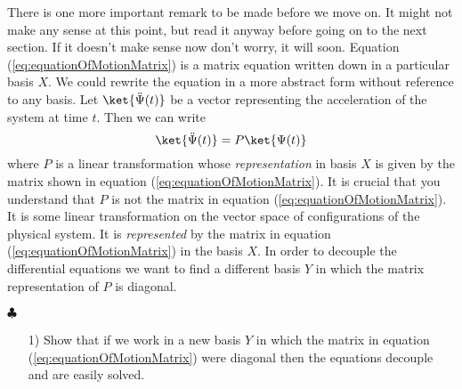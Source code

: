 There is one more important remark to be made before we move on.
It might not make any sense at this point, but read it anyway before going on to the next section.
If it doesn't make sense now don't worry, it will soon.
Equation (\ref{eq:equationOfMotionMatrix}) is a matrix equation written down in a particular basis $X$.
We could rewrite the equation in a more abstract form without reference to any basis.
Let $\ket{\ddot{\Psi}(t)}$ be a vector representing the acceleration of the system at time $t$.
Then we can write
\begin{equation}\label{eq:equationOfMotionAbstract}
\ket{\ddot{\Psi}(t)} = P \ket{\Psi (t)}
\end{equation}
where $P$ is a linear transformation whose \emph{representation} in basis $X$ is given by the matrix shown in equation (\ref{eq:equationOfMotionMatrix}).
It is crucial that you understand that $P$ is not the matrix in equation (\ref{eq:equationOfMotionMatrix}).
It is some linear transformation on the vector space of configurations of the physical system.
It is \emph{represented} by the matrix in equation (\ref{eq:equationOfMotionMatrix}) in the basis $X$.
In order to decouple the differential equations we want to find a different basis $Y$ in which the matrix representation of $P$ is diagonal.
\begin{flushright} $\clubsuit$ \end{flushright}

\begin{itemize}
  \item[1)] Show that if we work in a new basis $Y$ in which the matrix in equation (\ref{eq:equationOfMotionMatrix}) were diagonal then the equations decouple and are easily solved.
\end{itemize}

